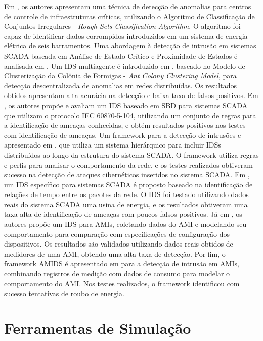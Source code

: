 \documentclass[cic,tc]{iiufrgs}
\begin{document}
Em \cite{coutinho2009anomaly}, os autores apresentam uma técnica de detecção de anomalias para centros de controle de infraestruturas críticas, utilizando o Algoritmo de Classificação de Conjuntos Irregulares - \emph{Rough Sets Classification Algorithm}. O algoritmo foi capaz de identificar dados corrompidos introduzidos em um sistema de energia elétrica de seis barramentos. Uma abordagem à detecção de intrusão em sistemas SCADA baseada em Análise de Estado Crítico e Proximidade de Estados é analisada em \cite{carcano2011multidim}. Um IDS multiagente é introduzido em \cite{tsang2005multi}, baseado no Modelo de Clusterização da Colônia de Formigas - \emph{Ant Colony Clustering Model}, para detecção descentralizada de anomalias em redes distribuídas. Os resultados obtidos apresentam alta acurácia na detecção e baixa taxa de falsos positivos. Em \cite{yang2013iecdetection}, os autores propõe e avaliam um IDS baseado em SBD para sistemas SCADA que utilizam o protocolo IEC 60870-5-104, utilizando um conjunto de regras para a identificação de ameaças conhecidas, e obtém resultados positivos nos testes com identificação de ameaças. Um framework para a detecção de intrusões e apresentado em \cite{2014multiattribute}, que utiliza um sistema hierárquico para incluir IDSs distribuídos ao longo da estrutura do sistema SCADA. O framework utiliza regras e perfis para analisar o comportamento da rede, e os testes realizados obtiveram sucesso na detecção de ataques cibernéticos inseridos no sistema SCADA. Em \cite{2014temporalintrusion}, um IDS específico para sistemas SCADA é proposto baseado na identificação de relações de tempo entre os pacotes da rede. O IDS foi testado utilizando dados reais do sistema SCADA uma usina de energia, e os resultados obtiveram uma taxa alta de identificação de ameaças com poucos falsos positivos. Já em \cite{aliprobabilistic}, os autores propõe um IDS para AMIs, coletando dados do AMI e modelando seu comportamento para comparação com especificações de configuração dos dispositivos. Os resultados são validados utilizando dados reais obtidos de medidores de uma AMI, obtendo uma alta taxa de detecção. Por fim, o framework AMIDS é apresentado em \cite{mclaughlinamids} para a detecção de intrusão em AMIs, combinando registros de medição com dados de consumo para modelar o comportamento do AMI. Nos testes realizados, o framework identificou com sucesso tentativas de roubo de energia.

\section{Ferramentas de Simulação}
\label{sectools}
\end{document}
